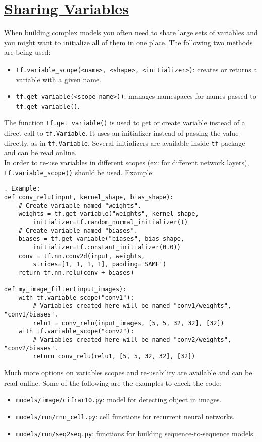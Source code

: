 \documentclass[11pt,a4paper]{article}
\begin{document}
\section{\href{www.tensorflow.org/versions/r0.11/how_tos/variable_scope/index.html}{Sharing Variables}}
When building complex models you often need to share large sets of variables and you might want to initialize all of them in one place. The following two methods are being used: 
\begin{itemize}
	\item \texttt{tf.variable\_scope(<name>, <shape>, <initializer>)}: creates or returns a variable with a given name.
	\item \texttt{tf.get\_variable(<scope\_name>))}: manages namespaces for names passed to \texttt{tf.get\_variable()}. 
\end{itemize}
The function \texttt{tf.get\_variable()} is used to get or create variable instead of a direct call to \texttt{tf.Variable}. It uses an initializer instead of passing the value directly, as in \texttt{tf.Variable}. Several initializers are available inside \texttt{tf} package and can be read online. \\
In order to re-use variables in different scopes (ex: for different network layers), \texttt{tf.variable\_scope()} should be used. Example: 
\begin{lstlisting}. Example: 
def conv_relu(input, kernel_shape, bias_shape):
    # Create variable named "weights".
    weights = tf.get_variable("weights", kernel_shape,
        initializer=tf.random_normal_initializer())
    # Create variable named "biases".
    biases = tf.get_variable("biases", bias_shape,
        initializer=tf.constant_initializer(0.0))
    conv = tf.nn.conv2d(input, weights,
        strides=[1, 1, 1, 1], padding='SAME')
    return tf.nn.relu(conv + biases)
    
def my_image_filter(input_images):
    with tf.variable_scope("conv1"):
        # Variables created here will be named "conv1/weights", "conv1/biases".
        relu1 = conv_relu(input_images, [5, 5, 32, 32], [32])
    with tf.variable_scope("conv2"):
        # Variables created here will be named "conv2/weights", "conv2/biases".
        return conv_relu(relu1, [5, 5, 32, 32], [32])   
  \end{lstlisting}
  Much more options on variables scopes and re-usability are available and can be read online. Some of the following are the examples to check the code: 
  \begin{itemize}
  	\item \texttt{models/image/cifrar10.py}: model for detecting object in images. 
  	\item \texttt{models/rnn/rnn\_cell.py}: cell functions for recurrent neural networks. 
  	\item \texttt{models/rnn/seq2seq.py}: functions for building sequence-to-sequence models. 
  \end{itemize}
  
\end{document}
